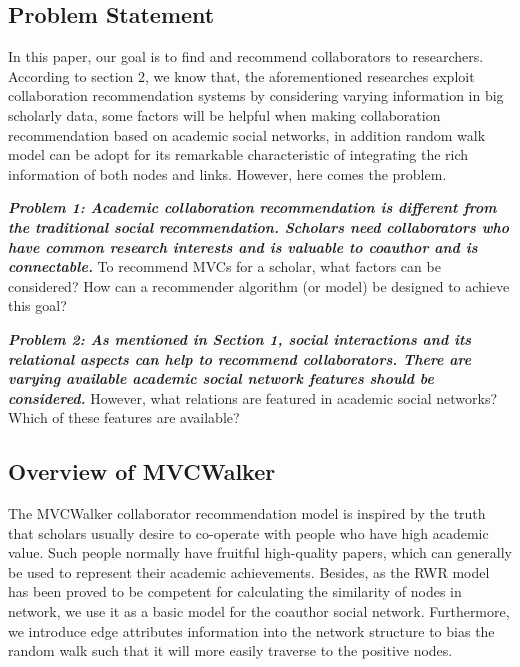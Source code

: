 \documentclass[10pt,journal,compsoc]{IEEEtran}
\begin{document}
\subsection{Problem Statement}

In this paper, our goal is to find and recommend collaborators to researchers. According to section 2, we know that, the aforementioned researches exploit collaboration recommendation systems by considering varying information in big scholarly data, some factors will be helpful when making collaboration recommendation based on academic social networks, in addition random walk model can be adopt for its remarkable characteristic of integrating the rich information of both nodes and links. However, here comes the problem.

\textit{\textbf{Problem 1: Academic collaboration recommendation is different from the traditional social recommendation. Scholars need collaborators who have common research interests and is valuable to coauthor and is connectable.}} To recommend MVCs for a scholar, what factors can be considered? How can a recommender algorithm (or model) be designed to achieve this goal?

\textit{\textbf{Problem 2: As mentioned in Section 1, social interactions and its relational aspects can help to recommend collaborators. There are varying available academic social network features should be considered. }} However, what relations are featured in academic social networks? Which of these features are available?

\subsection{Overview of MVCWalker}
The MVCWalker collaborator recommendation model is inspired by the truth that scholars usually desire to co-operate with people who have high academic value. Such people normally have fruitful high-quality papers, which can generally be used to represent their academic achievements. Besides, as the RWR model has been proved to be competent for calculating the similarity of nodes in network, we use it as a basic model for the coauthor social network. Furthermore, we introduce edge attributes information into the network structure to bias the random walk such that it will more easily traverse to the positive nodes.
\end{document}

